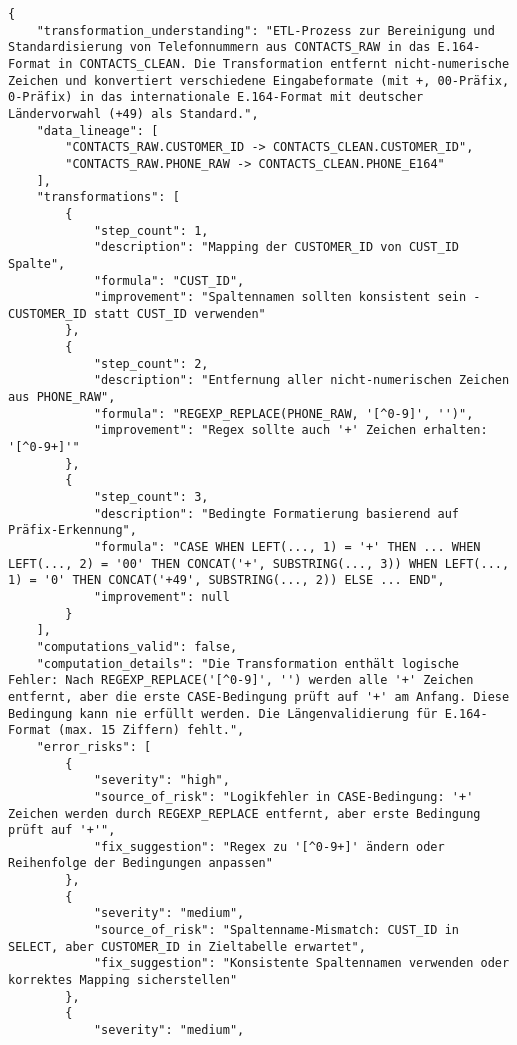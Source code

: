 \begin{lstlisting}[caption={Ausgabe: Claude Sonnet 4 Anwendungsfall 3 Konsistenzdurchlauf},label={claude_case3_prompt2}]
{
    "transformation_understanding": "ETL-Prozess zur Bereinigung und Standardisierung von Telefonnummern aus CONTACTS_RAW in das E.164-Format in CONTACTS_CLEAN. Die Transformation entfernt nicht-numerische Zeichen und konvertiert verschiedene Eingabeformate (mit +, 00-Präfix, 0-Präfix) in das internationale E.164-Format mit deutscher Ländervorwahl (+49) als Standard.",
    "data_lineage": [
        "CONTACTS_RAW.CUSTOMER_ID -> CONTACTS_CLEAN.CUSTOMER_ID",
        "CONTACTS_RAW.PHONE_RAW -> CONTACTS_CLEAN.PHONE_E164"
    ],
    "transformations": [
        {
            "step_count": 1,
            "description": "Mapping der CUSTOMER_ID von CUST_ID Spalte",
            "formula": "CUST_ID",
            "improvement": "Spaltennamen sollten konsistent sein - CUSTOMER_ID statt CUST_ID verwenden"
        },
        {
            "step_count": 2,
            "description": "Entfernung aller nicht-numerischen Zeichen aus PHONE_RAW",
            "formula": "REGEXP_REPLACE(PHONE_RAW, '[^0-9]', '')",
            "improvement": "Regex sollte auch '+' Zeichen erhalten: '[^0-9+]'"
        },
        {
            "step_count": 3,
            "description": "Bedingte Formatierung basierend auf Präfix-Erkennung",
            "formula": "CASE WHEN LEFT(..., 1) = '+' THEN ... WHEN LEFT(..., 2) = '00' THEN CONCAT('+', SUBSTRING(..., 3)) WHEN LEFT(..., 1) = '0' THEN CONCAT('+49', SUBSTRING(..., 2)) ELSE ... END",
            "improvement": null
        }
    ],
    "computations_valid": false,
    "computation_details": "Die Transformation enthält logische Fehler: Nach REGEXP_REPLACE('[^0-9]', '') werden alle '+' Zeichen entfernt, aber die erste CASE-Bedingung prüft auf '+' am Anfang. Diese Bedingung kann nie erfüllt werden. Die Längenvalidierung für E.164-Format (max. 15 Ziffern) fehlt.",
    "error_risks": [
        {
            "severity": "high",
            "source_of_risk": "Logikfehler in CASE-Bedingung: '+' Zeichen werden durch REGEXP_REPLACE entfernt, aber erste Bedingung prüft auf '+'",
            "fix_suggestion": "Regex zu '[^0-9+]' ändern oder Reihenfolge der Bedingungen anpassen"
        },
        {
            "severity": "medium",
            "source_of_risk": "Spaltenname-Mismatch: CUST_ID in SELECT, aber CUSTOMER_ID in Zieltabelle erwartet",
            "fix_suggestion": "Konsistente Spaltennamen verwenden oder korrektes Mapping sicherstellen"
        },
        {
            "severity": "medium",

\end{lstlisting}
